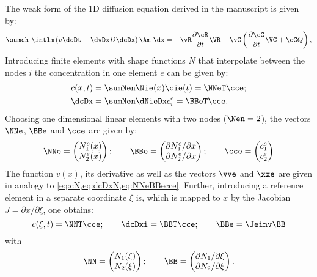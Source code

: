  
  The weak form of the 1D diffusion equation derived in the manuscript is given by:
  \begin{equation}
    \sumch \ \intlm \left( v \dcDt + \dvDx D \dcDx \right) \Am \ \dx= - \vR \frac{\partial \cR}{\partial t} \VR - \vC \left( \frac{\partial \cC}{\partial t} \VC + \cC Q\right), 
    \label{eq:weakForm}
  \end{equation}  
  Introducing finite elements with shape functions $N$ that interpolate between the nodes $i$ the concentration in one element $e$ can be given by:
  \begin{align}
    c(x,t) &= \sumNen \Nie(x) \cie(t) = \NNeT \cce \label{eq:cN};\\
    \dcDx &= \sumNen \dNieDx c_i^e= \BBeT \cce.
    \label{eq:dcDxN}
  \end{align}
  Choosing one dimensional linear elements with two nodes ($\Nen=2$), the vectors $\NNe$, $\BBe$ and $\cce$ are given by:
  \begin{equation}
    \NNe = \begin{pmatrix} N_1^e(x) \\ N_2^e(x) \end{pmatrix}; \qquad 
    \BBe = \begin{pmatrix} \partial N_1^e / \partial x \\ \partial N_2^e / \partial x \end{pmatrix}; \qquad 
    \cce = \begin{pmatrix} c_1^e \\ c_2^e \end{pmatrix}
    \label{eq:NNeBBecce}
  \end{equation}
  The function $v(x)$, its derivative as well as the vectors $\vve$ and $\xxe$ are given in analogy to \cref{eq:cN,eq:dcDxN,eq:NNeBBecce}. Further, introducing a reference element in a separate coordinate $\xi$ is, which is mapped to $x$ by the Jacobian \mbox{$J=\partial x / \partial \xi$}, one obtains:
  \begin{equation}
    c(\xi,t) = \NNT \cce; \qquad \dcDxi = \BBT \cce; \qquad \BBe = \Jeinv \BB
  \end{equation}
  with
  \begin{equation}
    \NN = \begin{pmatrix} N_1(\xi) \\ N_2(\xi) \end{pmatrix}; \qquad 
    \BB = \begin{pmatrix} \partial N_1 / \partial \xi \\ \partial N_2 /\partial \xi \end{pmatrix}.
  \end{equation}
